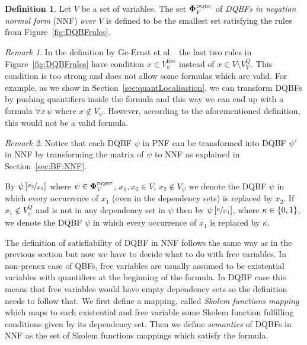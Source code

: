 \documentclass[
  digital, %
  color,
  twoside, %
  table,   %
  nolof,     %
  nolot,     %
]{fithesis3}
\let\setbuilder\set
\newcommand{\simpleset}[1]{\{{#1}\}}
\renewcommand{\set}[1]{\normalexpandarg\IfSubStr{#1}{|}{\setbuilder{#1}}{\simpleset{#1}}}
\theoremstyle{definition}
\newtheorem{definition}{Definition}
\theoremstyle{remark}
\newtheorem*{remark}{Remark}
\newcommand{\substitute}[2]{\left[ \nicefrac{#2}{#1} \right]}
\newcommand{\DQBF}[1]{\mathbf{\Phi}_{#1}^{\normalfont{\text{\tiny DQBF}}}}
\newcommand{\fvars}[1]{V_{#1}^{\mathrm{free}}}
\newcommand{\qvars}[1]{V_{#1}^{Q}}
\newcommand{\itholds}{\,}
\begin{document}
\begin{definition}
  Let $V$ be a set of variables. The set $\DQBF{V}$ of \emph{DQBFs in negation normal form} (NNF) \emph{over $V$} is defined to be the smallest set satisfying the rules from Figure~\ref{fig:DQBFrules}.
\end{definition}
\begin{remark}
In the definition by Ge-Ernst et al.~\cite{HQSquantifierLocalisation} the last two rules in Figure~\ref{fig:DQBFrules} have condition $x \in \fvars{\psi}$ instead of $x \in V \setminus \qvars{V}$. This condition is too strong and does not allow some formulas which are valid. 
For example, as we show in Section~\ref{sec:quantLocalisation}, we can transform DQBFs by pushing quantifiers inside the formula and this way we can end up with a formula $\forall x \itholds \psi$ where $x \not\in V_{\psi}$. However, according to the aforementioned definition, this would not be a valid formula.
\end{remark}

\begin{remark}
Notice that each DQBF $\psi$ in PNF can be transformed into DQBF $\psi'$ in NNF by transforming the matrix of $\psi$ to NNF as explained in Section~\ref{sec:BF:NNF}.
\end{remark}

By $\psi\substitute{x_1}{x_2}$ where $\psi \in \DQBF{V}$, $x_1, x_2 \in V$, $x_2 \not\in V_{\psi}$ we denote the DQBF $\psi$ in which every occurrence of $x_1$ (even in the dependency sets) is replaced by $x_2$. If $x_1 \not\in \qvars{\psi}$ and is not in any dependency set in $\psi$ then by $\psi\substitute{x_1}{\kappa}$, where $\kappa\in\set{0,1}$, we denote the DQBF $\psi$ in which every occurrence of $x_1$ is replaced by $\kappa$.

The definition of satisfiability of DQBF in NNF follows the same way as in the previous section but now we have to decide what to do with free variables. In non-prenex case of QBFs, free variables are usually assumed to be existential variables with quantifiers at the beginning of the formula. In DQBF case this means that free variables would have empty dependency sets so the definition needs to follow that. We first define a mapping, called \emph{Skolem functions mapping} which maps to each existential and free variable some Skolem function fulfilling conditions given by its dependency set. Then we define \emph{semantics} of DQBFs in NNF as the set of Skolem functions mappings which satisfy the formula.
\end{document}
